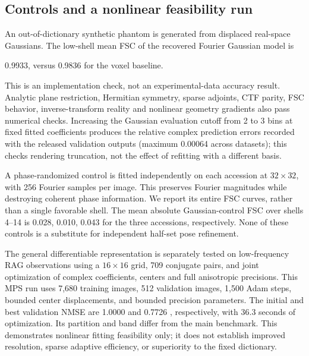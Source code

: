 \subsection{Controls and a nonlinear feasibility run}
An out-of-dictionary synthetic phantom is generated from displaced real-space
Gaussians. The low-shell mean FSC of the recovered Fourier Gaussian model is

0.9933, versus 0.9836 for the voxel baseline.

This is an implementation check, not an experimental-data accuracy result.
Analytic plane restriction, Hermitian symmetry, sparse adjoints, CTF parity,
FSC behavior, inverse-transform reality and nonlinear geometry gradients also
pass numerical checks. Increasing the Gaussian evaluation cutoff from 2 to 3
bins at fixed fitted coefficients produces the relative complex prediction
errors recorded with the released validation outputs (maximum 0.00064 across datasets); this checks rendering
truncation, not the effect of refitting with a different basis.

A phase-randomized control is fitted independently on each accession at
$32\times32$, with 256 Fourier samples per image. This preserves Fourier
magnitudes while destroying coherent phase information. We report its entire
FSC curves, rather than a single favorable shell. The mean absolute Gaussian-control FSC over shells 4--14 is 0.028, 0.010, 0.043 for the three accessions, respectively. None of these controls is a
substitute for independent half-set pose refinement.

The general differentiable representation is separately tested on low-frequency
RAG observations using a $16\times16$ grid,
709
 conjugate pairs, and
joint optimization of complex coefficients, centers and full anisotropic
precisions. This MPS run uses 7,680 training images, 512 validation images, 1,500
Adam steps, bounded center displacements, and bounded precision parameters.
The initial and best validation NMSE are
1.0000 and 0.7726
, respectively,
with
36.3
 seconds of optimization. Its partition and band differ
from the main benchmark. This demonstrates nonlinear fitting feasibility only;
it does not establish improved resolution, sparse adaptive efficiency, or
superiority to the fixed dictionary.
